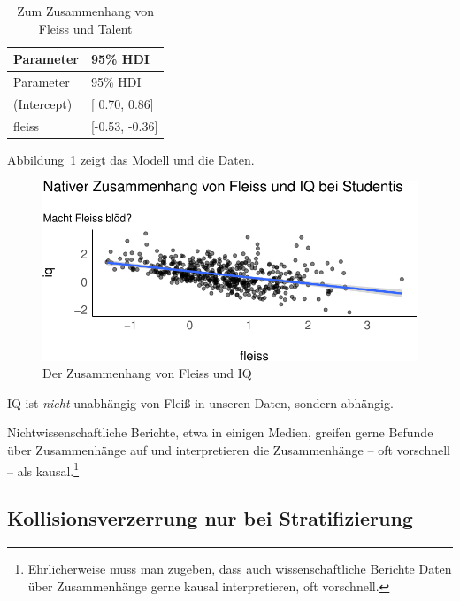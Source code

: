 \documentclass[
  a4paper,
  DIV=11]{scrreprt}
\theoremstyle{definition}
\theoremstyle{remark}
\begin{document}
\hypertarget{tbl-m-eignung}{}
\begin{longtable}[]{@{}ll@{}}
\caption{\label{tbl-m-eignung}Zum Zusammenhang von Fleiss und
Talent}\tabularnewline
\toprule()
Parameter & 95\% HDI \\
\midrule()
\endfirsthead
\toprule()
Parameter & 95\% HDI \\
\midrule()
\endhead
(Intercept) & {[} 0.70, 0.86{]} \\
fleiss & {[}-0.53, -0.36{]} \\
\bottomrule()
\end{longtable}

Abbildung~\ref{fig-eignung} zeigt das Modell und die Daten.

\begin{figure}

{\centering \includegraphics{./kausal_files/figure-pdf/fig-eignung-1.pdf}

}

\caption{\label{fig-eignung}Der Zusammenhang von Fleiss und IQ}

\end{figure}

IQ ist \emph{nicht} unabhängig von Fleiß in unseren Daten, sondern
abhängig.

Nichtwissenschaftliche Berichte, etwa in einigen Medien, greifen gerne
Befunde über Zusammenhänge auf und interpretieren die Zusammenhänge --
oft vorschnell -- als kausal.\footnote{Ehrlicherweise muss man zugeben,
  dass auch wissenschaftliche Berichte Daten über Zusammenhänge gerne
  kausal interpretieren, oft vorschnell.}

\hypertarget{kollisionsverzerrung-nur-bei-stratifizierung}{%
\subsection{Kollisionsverzerrung nur bei
Stratifizierung}\label{kollisionsverzerrung-nur-bei-stratifizierung}}
\end{document}
